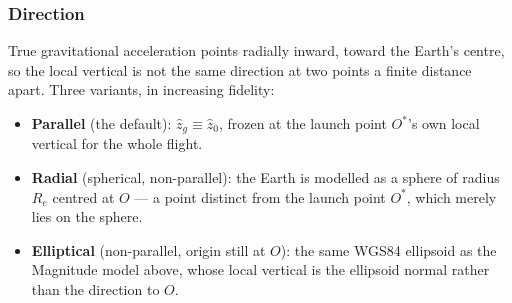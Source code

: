 \subsubsection{Direction}
True gravitational acceleration points radially inward, toward the Earth's centre, so the local
vertical is not the same direction at two points a finite distance apart. Three variants, in
increasing fidelity:
\begin{itemize}
    \item \textbf{Parallel} (the default): $\hat{z}_g\equiv\hat{z}_0$, frozen at the launch point
    $O^*$'s own local vertical for the whole flight.
    \item \textbf{Radial} (spherical, non-parallel): the Earth is modelled as a sphere of radius
    $R_e$ centred at $O$ --- a point distinct from the launch point $O^*$, which merely lies on
    the sphere.
    \item \textbf{Elliptical} (non-parallel, origin still at $O$): the same WGS84 ellipsoid as the
    Magnitude model above, whose local vertical is the ellipsoid normal rather than the direction
    to $O$.
\end{itemize}

